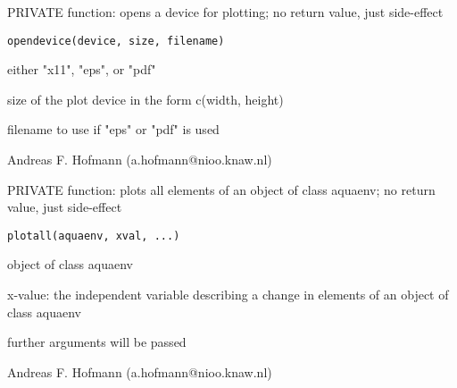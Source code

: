\documentclass{article}
\begin{document}
\begin{Description}\relax
PRIVATE function: opens a device for plotting; no return value, just side-effect
\end{Description}
\begin{Usage}
\begin{verbatim}opendevice(device, size, filename)\end{verbatim}
\end{Usage}
\begin{Arguments}
\begin{ldescription}
\item[\code{device }] either "x11", "eps", or "pdf"
\item[\code{size }] size of the plot device in the form c(width, height)
\item[\code{filename }] filename to use if "eps" or "pdf" is used
\end{ldescription}
\end{Arguments}
\begin{Author}\relax
Andreas F. Hofmann (a.hofmann@nioo.knaw.nl)
\end{Author}


\begin{Description}\relax
PRIVATE function: plots all elements of an object of class aquaenv; no return value, just side-effect
\end{Description}
\begin{Usage}
\begin{verbatim}plotall(aquaenv, xval, ...)\end{verbatim}
\end{Usage}
\begin{Arguments}
\begin{ldescription}
\item[\code{aquaenv }] object of class aquaenv
\item[\code{xval }] x-value: the independent variable describing a change in elements of an object of class aquaenv
\item[\code{... }] further arguments will be passed
\end{ldescription}
\end{Arguments}
\begin{Author}\relax
Andreas F. Hofmann (a.hofmann@nioo.knaw.nl)
\end{Author}
\end{document}
